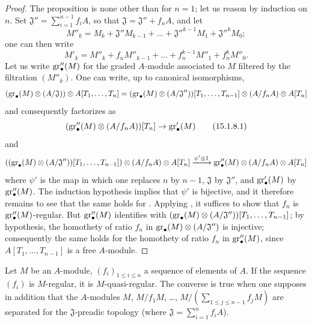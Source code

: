 \begin{proof}
The proposition is none other than  for $n=1$;
let us reason by induction on $n$.
Set $\mathfrak{J}''=\sum_{i=1}^{n-1}f_iA$, so that $\mathfrak{J}=\mathfrak{J}''+f_nA$, and let
\[
  M''_k = M_k+\mathfrak{J}''M_{k-1}+\ldots+\mathfrak{J}''^{k-1}M_1+\mathfrak{J}''^kM_0;
\]
one can then write
\[
  M'_k = M''_k + f_nM''_{k-1}+\ldots+f_n^{k-1}M''_1+f_n^kM''_0.
\]
Let us write $\operatorname{gr}''_\bullet(M)$ for the graded $A$-module associated to $M$ filtered by the filtration $(M''_k)$.
One can write, up to canonical isomorphisms,
\[
  (\operatorname{gr}_\bullet(M)\otimes(A/\mathfrak{J}))\otimes A[T_1,\ldots,T_n]
  = (\operatorname{gr}_\bullet(M)\otimes(A/\mathfrak{J}''))[T_1,\ldots,T_{n-1}]\otimes(A/f_nA)\otimes A[T_n]
\]
and consequently  factorizes as
\[
\label{0.15.1.8.1}
  (\operatorname{gr}''_\bullet(M)\otimes(A/f_nA))[T_n] \to \operatorname{gr}'_\bullet(M)
\tag{15.1.8.1}
\]
and
\[
  ((\operatorname{gr}_\bullet(M)\otimes(A/\mathfrak{J}''))[T_1,\ldots,T_{n-1}])\otimes(A/f_nA)\otimes A[T_n]
  \xrightarrow{\psi'\otimes 1} \operatorname{gr}''_\bullet(M)\otimes(A/f_nA)\otimes A[T_n]
\]
where $\psi'$ is the map  in which one replaces $n$ by $n-1$, $\mathfrak{J}$ by $\mathfrak{J}''$, and $\operatorname{gr}'_\bullet(M)$ by $\operatorname{gr}''_\bullet(M)$.
The induction hypothesis implies that $\psi'$ is bijective, and it therefore remains to see that the same holds for .
Applying , it suffices to show that $f_n$ is $\operatorname{gr}''_\bullet(M)$-regular.
But $\operatorname{gr}''_\bullet(M)$ identifies with $(\operatorname{gr}_\bullet(M)\otimes(A/\mathfrak{J}''))[T_1,\ldots,T_{n-1}]$;
by hypothesis, the homothety of ratio $f_n$ in $\operatorname{gr}_\bullet(M)\otimes(A/\mathfrak{J}'')$ is injective;
consequently the same holds for the homothety of ratio $f_n$ in $\operatorname{gr}''_\bullet(M)$, since $A[T_1,\ldots,T_{n-1}]$ is a free $A$-module.
\end{proof}

\begin{proposition}[15.1.9]
\label{0.15.1.9}
Let $M$ be an $A$-module, $(f_i)_{1\leq i\leq n}$ a sequence of elements of $A$.
If the sequence $(f_i)$ is $M$-regular, it is $M$-quasi-regular.
The converse is true when one supposes in addition that the $A$-modules $M$, $M/f_1M$, \ldots, $M/(\sum_{1\leq j\leq n-1}f_jM)$ are separated for the $\mathfrak{J}$-preadic topology (where $\mathfrak{J}=\sum_{i=1}^n f_iA$).
\end{proposition}

